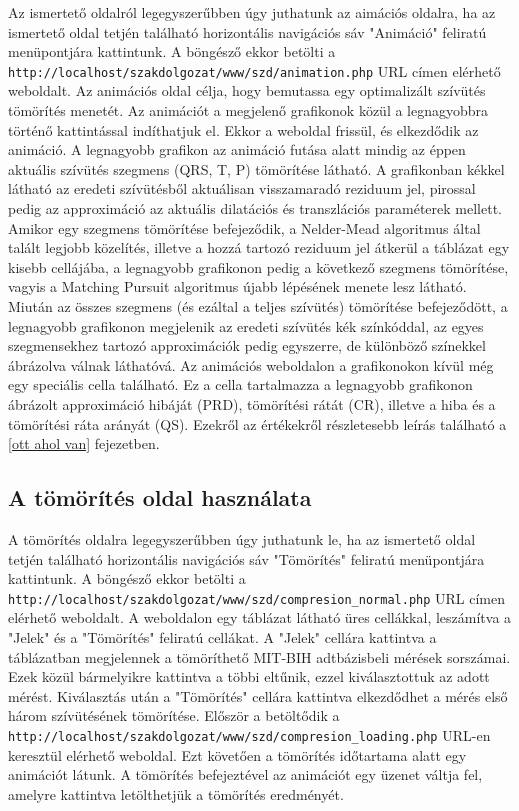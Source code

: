 \documentclass[oneside,titlepage,12pt,a4paper]{report}
\begin{document}
Az ismertető oldalról legegyszerűbben úgy juthatunk az aimációs oldalra, ha az ismertető oldal tetjén található horizontális navigációs sáv "Animáció" feliratú menüpontjára kattintunk. A böngésző ekkor betölti a \texttt{http://localhost/szakdolgozat/www/szd/animation.php} URL címen elérhető weboldalt. Az animációs oldal célja, hogy bemutassa egy optimalizált szívütés tömörítés menetét. Az animációt a megjelenő grafikonok közül a legnagyobbra történő kattintással indíthatjuk el. Ekkor a weboldal frissül, és elkezdődik az animáció. A legnagyobb grafikon az animáció futása alatt mindig az éppen aktuális szívütés szegmens (QRS, T, P) tömörítése látható. A grafikonban kékkel látható az eredeti szívütésből aktuálisan visszamaradó reziduum jel, pirossal pedig az approximáció az aktuális dilatációs és transzlációs paraméterek mellett. Amikor egy szegmens tömörítése befejeződik, a Nelder-Mead algoritmus által talált legjobb közelítés, illetve a hozzá tartozó reziduum jel átkerül a táblázat egy kisebb cellájába, a legnagyobb grafikonon pedig a következő szegmens tömörítése, vagyis a Matching Pursuit algoritmus újabb lépésének menete lesz látható. Miután az összes szegmens (és ezáltal a teljes szívütés) tömörítése befejeződött, a legnagyobb grafikonon megjelenik az eredeti szívütés kék színkóddal, az egyes szegmensekhez tartozó approximációk pedig egyszerre, de különböző színekkel ábrázolva válnak láthatóvá. Az animációs weboldalon a grafikonokon kívül még egy speciális cella található. Ez a cella tartalmazza a legnagyobb grafikonon ábrázolt approximáció hibáját (PRD), tömörítési rátát (CR), illetve a hiba és a tömörítési ráta arányát (QS). Ezekről az értékekről részletesebb leírás található a \ref{ott ahol van} fejezetben.

\subsection*{A tömörítés oldal használata}

A tömörítés oldalra legegyszerűbben úgy juthatunk le, ha az ismertető oldal tetjén található horizontális navigációs sáv "Tömörítés" feliratú menüpontjára kattintunk. A böngésző ekkor betölti a \texttt{http://localhost/szakdolgozat/www/szd/compresion\_normal.php} URL címen elérhető weboldalt. A weboldalon egy táblázat látható üres cellákkal, leszámítva a "Jelek" és a "Tömörítés" feliratú cellákat. A "Jelek" cellára kattintva a táblázatban megjelennek a tömöríthető MIT-BIH adtbázisbeli mérések sorszámai. Ezek közül bármelyikre kattintva a többi eltűnik, ezzel kiválasztottuk az adott mérést. Kiválasztás után a "Tömörítés" cellára kattintva elkezdődhet a mérés első három szívütésének tömörítése. Először a betöltődik a \texttt{http://localhost/szakdolgozat/www/szd/compresion\_loading.php} URL-en keresztül elérhető weboldal. Ezt követően a tömörítés időtartama alatt egy animációt látunk. A tömörítés befejeztével az animációt egy üzenet váltja fel, amelyre kattintva letölthetjük a tömörítés eredményét.
\end{document}
